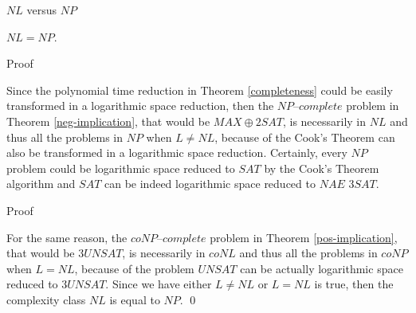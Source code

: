 \documentclass[11pt]{beamer}
\begin{document}
\begin{frame}{$NL$ versus $NP$}

\begin{theorem}
$NL = NP$.
\end{theorem}

\end{frame}

\begin{frame}{Proof}

Since the polynomial time reduction in Theorem \ref{completeness} could be easily transformed in a logarithmic space reduction, then the $\textit{NP--complete}$ problem in Theorem \ref{neg-implication}, that would be $MAX\oplus2SAT$, is necessarily in $NL$ and thus all the problems in $NP$ when $L \neq NL$, because of the Cook's Theorem can also be transformed in a logarithmic space reduction. Certainly, every $NP$ problem could be logarithmic space reduced to $SAT$ by the Cook's Theorem algorithm and $SAT$ can be indeed logarithmic space reduced to $\textit{NAE 3SAT}$.

\end{frame}

\begin{frame}{Proof}

For the same reason, the $\textit{coNP--complete}$ problem in Theorem \ref{pos-implication}, that would be $3UNSAT$, is necessarily in $coNL$ and thus all the problems in $coNP$ when $L = NL$, because of the problem $UNSAT$ can be actually logarithmic space reduced to $3UNSAT$. Since we have either $L \neq NL$ or $L = NL$ is true, then the complexity class $NL$ is equal to $NP$. \qed

\end{frame}
\end{document}
